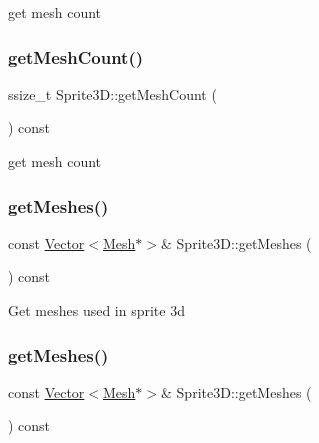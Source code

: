 get mesh count \mbox{\label{classSprite3D_a472b051ff3eb91ceaf56eee60257ccae}} 
\subsubsection{\texorpdfstring{get\+Mesh\+Count()}{getMeshCount()}\hspace{0.1cm}{\footnotesize\ttfamily [2/2]}}
{\footnotesize\ttfamily ssize\+\_\+t Sprite3\+D\+::get\+Mesh\+Count (\begin{DoxyParamCaption}{ }\end{DoxyParamCaption}) const\hspace{0.3cm}{\ttfamily [inline]}}

get mesh count \mbox{\label{classSprite3D_a024e3c351fa61b0a8c39dfcd2ee3dd0e}} 
\subsubsection{\texorpdfstring{get\+Meshes()}{getMeshes()}\hspace{0.1cm}{\footnotesize\ttfamily [1/2]}}
{\footnotesize\ttfamily const \hyperlink{classVector}{Vector}$<$\hyperlink{classMesh}{Mesh}$\ast$$>$\& Sprite3\+D\+::get\+Meshes (\begin{DoxyParamCaption}{ }\end{DoxyParamCaption}) const\hspace{0.3cm}{\ttfamily [inline]}}

Get meshes used in sprite 3d \mbox{\label{classSprite3D_a024e3c351fa61b0a8c39dfcd2ee3dd0e}} 
\subsubsection{\texorpdfstring{get\+Meshes()}{getMeshes()}\hspace{0.1cm}{\footnotesize\ttfamily [2/2]}}
{\footnotesize\ttfamily const \hyperlink{classVector}{Vector}$<$\hyperlink{classMesh}{Mesh}$\ast$$>$\& Sprite3\+D\+::get\+Meshes (\begin{DoxyParamCaption}{ }\end{DoxyParamCaption}) const\hspace{0.3cm}{\ttfamily [inline]}}

